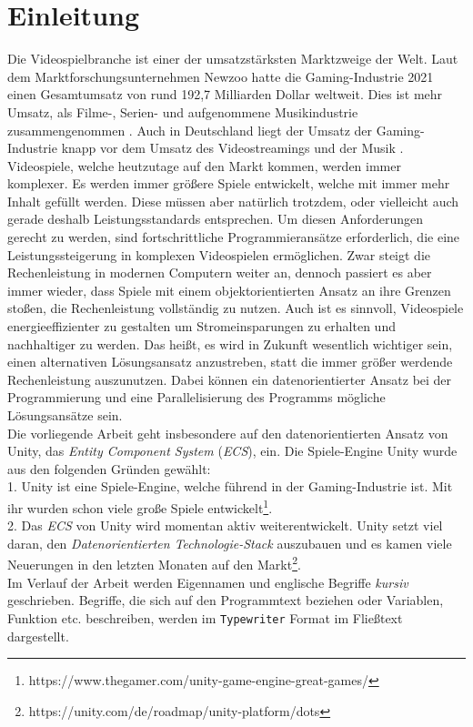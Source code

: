 \section{Einleitung}
Die Videospielbranche ist einer der umsatzstärksten Marktzweige der Welt. Laut dem Marktforschungsunternehmen Newzoo hatte die Gaming-Industrie 2021 einen Gesamtumsatz von rund 192,7 Milliarden Dollar weltweit. Dies ist mehr Umsatz, als Filme-, Serien- und aufgenommene Musikindustrie zusammengenommen \cite{Spiele-Industrie-weltweit}. Auch in Deutschland liegt der Umsatz der Gaming-Industrie knapp vor dem Umsatz des Videostreamings und der Musik \cite{Spiele-Industrie-deutschland}.\\
Videospiele, welche heutzutage auf den Markt kommen, werden immer komplexer. Es werden immer größere Spiele entwickelt, welche mit immer mehr Inhalt gefüllt werden. Diese müssen aber natürlich trotzdem, oder vielleicht auch gerade deshalb Leistungsstandards entsprechen. Um diesen Anforderungen gerecht zu werden, sind fortschrittliche Programmieransätze erforderlich, die eine Leistungssteigerung in komplexen Videospielen ermöglichen. Zwar steigt die Rechenleistung in modernen Computern weiter an, dennoch passiert es aber immer wieder, dass Spiele mit einem objektorientierten Ansatz an ihre Grenzen stoßen, die Rechenleistung vollständig zu nutzen. Auch ist es sinnvoll, Videospiele energieeffizienter zu gestalten um Stromeinsparungen zu erhalten und nachhaltiger zu werden. Das heißt, es wird in Zukunft wesentlich wichtiger sein, einen alternativen Lösungsansatz anzustreben, statt die immer größer werdende Rechenleistung auszunutzen. Dabei können ein datenorientierter Ansatz bei der Programmierung und eine Parallelisierung des Programms mögliche Lösungsansätze sein.\\
Die vorliegende Arbeit geht insbesondere auf den datenorientierten Ansatz von Unity, das \textit{Entity Component System} (\textit{ECS}), ein. Die Spiele-Engine Unity wurde aus den folgenden Gründen gewählt:\\
1. Unity ist eine Spiele-Engine, welche führend in der Gaming-Industrie ist. Mit ihr wurden schon viele große Spiele entwickelt\footnote{https://www.thegamer.com/unity-game-engine-great-games/}.\\
2. Das \textit{ECS} von Unity wird momentan aktiv weiterentwickelt. Unity setzt viel daran, den \textit{Datenorientierten Technologie-Stack} auszubauen und es kamen viele Neuerungen in den letzten Monaten auf den Markt\footnote{https://unity.com/de/roadmap/unity-platform/dots}.\\
Im Verlauf der Arbeit werden Eigennamen und englische Begriffe \textit{kursiv} geschrieben. Begriffe, die sich auf den Programmtext beziehen oder Variablen, Funktion etc. beschreiben, werden im \texttt{Typewriter} Format im Fließtext dargestellt.